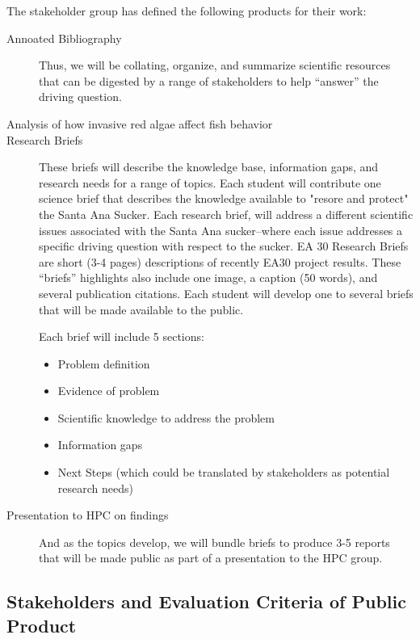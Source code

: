 \documentclass{article}\usepackage[]{graphicx}\usepackage[]{color}
\begin{document}
The stakeholder group has defined the following products for their work:

\begin{description}
  \item[Annoated Bibliography] Thus, we will be collating, organize, and summarize scientific resources that can be digested by a range of stakeholders to help ``answer'' the driving question. 
  \item[Analysis of how invasive red algae affect fish behavior]
  \item[Research Briefs] These briefs will describe the knowledge base, information gaps, and research needs for a range of topics. Each student will contribute one science brief that describes the knowledge available to "resore and protect" the Santa Ana Sucker. Each research brief, will address a different scientific issues associated with the Santa Ana sucker--where each issue addresses a specific driving question with respect to the sucker. EA 30 Research Briefs are short (3-4 pages) descriptions of recently EA30 project results. These ``briefs'' highlights also include one image, a caption (50 words), and several publication citations. Each student will develop one to several briefs that will be made available to the public.
  
Each brief will include 5 sections:

\begin{itemize}
  \item Problem definition
  \item Evidence of problem
  \item Scientific knowledge to address the problem
  \item Information gaps
  \item Next Steps (which could be translated by stakeholders as potential research needs)
\end{itemize}

  \item[Presentation to HPC on findings] And as the topics develop, we will bundle briefs to produce 3-5 reports that will be made public as part of a presentation to the HPC group.
\end{description}

\subsection{Stakeholders and Evaluation Criteria of Public Product}
\end{document}
